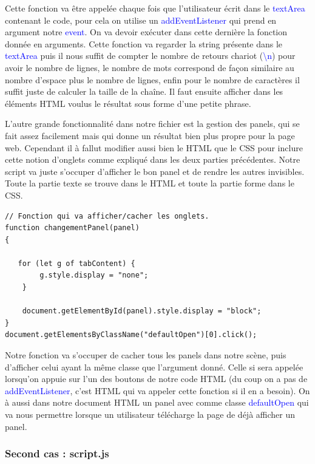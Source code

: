 \documentclass[a4paper]{article}
\renewcommand{\texttt}[2][blue]{\textcolor{#1}{\ttfamily #2}}
\begin{document}
Cette fonction va être appelée chaque fois que l'utilisateur écrit dans le
\texttt{textArea} contenant le code, pour cela on utilise un
\texttt{addEventListener} qui prend en argument notre \texttt{event}. On va
devoir exécuter dans cette dernière la fonction donnée en arguments. Cette
fonction va regarder la string présente dans le \texttt{textArea} puis il nous
suffit de compter le nombre de retours chariot (\texttt{\textbackslash n}) pour
avoir le nombre de lignes, le nombre de mots correspond de façon similaire au
nombre d'espace plus le nombre de lignes, enfin pour le nombre de caractères il
suffit juste de calculer la taille de la chaîne. Il faut ensuite afficher
dans les éléments HTML voulus le résultat sous forme d'une petite phrase.

L'autre grande fonctionnalité dans notre fichier est la gestion des panels, qui
se fait assez facilement mais qui donne un résultat bien plus propre pour la
page web. Cependant il à fallut modifier aussi bien le HTML que le CSS pour
inclure cette notion d'onglets comme expliqué dans les deux parties
précédentes. Notre script va juste s'occuper d'afficher le bon panel et de
rendre les autres invisibles. Toute la partie texte se trouve dans le HTML et
toute la partie forme dans le CSS.

\begin{lstlisting}[language=JS]
// Fonction qui va afficher/cacher les onglets.
function changementPanel(panel)
{

   for (let g of tabContent) {
        g.style.display = "none";
    }

    document.getElementById(panel).style.display = "block";
}
document.getElementsByClassName("defaultOpen")[0].click();

\end{lstlisting}

Notre fonction va s'occuper de cacher tous les panels dans notre scène, puis
d'afficher celui ayant la même classe que l'argument donné. Celle si sera
appelée lorsqu'on appuie sur l'un des boutons de notre code HTML (du coup on a
pas de \texttt{addEventListener}, c'est HTML qui va appeler cette fonction si
il en a besoin). On à aussi dans notre document HTML un panel avec comme classe
\texttt{defaultOpen} qui va nous permettre lorsque un utilisateur télécharge la
page de déjà afficher un panel.


\subsubsection{Second cas : script.js}
\end{document}
